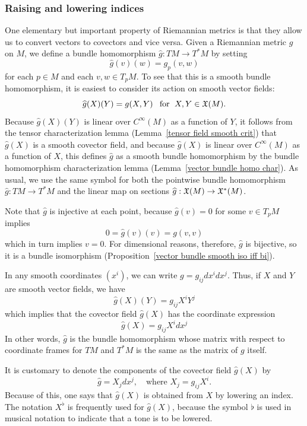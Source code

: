\subsubsection{Raising and lowering indices}
One elementary but important property of Riemannian metrics is that they allow us
to convert vectors to covectors and vice versa. Given a Riemannian metric $g$ on $M$,
we define a bundle homomorphism $\widehat{g}:TM\to T^*M$ by setting
\[\widehat{g}(v)(w)=g_p(v,w)\]
for each $p\in M$ and each $v,w\in T_pM$. To see that this is a smooth bundle 
homomorphism, it is easiest to consider its action on smooth vector fields:
\[\widehat{g}(X)(Y)=g(X,Y)\hspace{8pt}\text{for}\hspace{6pt} X,Y\in\mathfrak{X}(M).\]
Because $\widehat{g}(X)(Y)$ is linear over $C^\infty(M)$ as a function of $Y$, it 
follows from the tensor characterization lemma (Lemma~\ref{tensor field smooth crit}) 
that $\widehat{g}(X)$ is a smooth covector field, and because $\widehat{g}(X)$ is 
linear over $C^\infty(M)$ as a function of $X$, this defines $\widehat{g}$ as a 
smooth bundle homomorphism by the bundle homomorphism characterization lemma (Lemma~\ref{vector bundle homo char}). 
As usual, we use the same symbol for both the pointwise bundle homomorphism 
$\widehat{g}:TM\to T^*M$ and the linear map on sections $\widehat{g}:\mathfrak{X}(M)\to\mathfrak{X}^*(M)$.\par
Note that $\widehat{g}$ is injective at each point, because $\widehat{g}(v)=0$ 
for some $v\in T_pM$ implies
\[0=\widehat{g}(v)(v)=g(v,v)\]
which in turn implies $v=0$. For dimensional reasons, therefore, $\widehat{g}$ is 
bijective, so it is a bundle isomorphism (Proposition~\ref{vector bundle smooth iso iff bi}).\par
In any smooth coordinates $(x^i)$, we can write $g=g_{ij}dx^idx^j$. Thus, if $X$ 
and $Y$ are smooth vector fields, we have
\[\widehat{g}(X)(Y)=g_{ij}X^iY^j\]
which implies that the covector field $\widehat{g}(X)$ has the coordinate 
expression
\[\widehat{g}(X)=g_{ij}X^idx^j\]
In other words, $\widehat{g}$ is the bundle homomorphism whose matrix with respect 
to coordinate frames for $TM$ and $T^*M$ is the same as the matrix of $g$ itself.\par
It is customary to denote the components of the covector field $\widehat{g}(X)$ by
\[\widehat{g}=X_jdx^j,\quad\text{where }X_j=g_{ij}X^i.\]
Because of this, one says that $\widehat{g}(X)$ is obtained from $X$ by lowering 
an index. The notation $X^\flat$ is frequently used for $\widehat{g}(X)$, because 
the symbol $\flat$ is used in musical notation to indicate that a tone is to be 
lowered.\par
